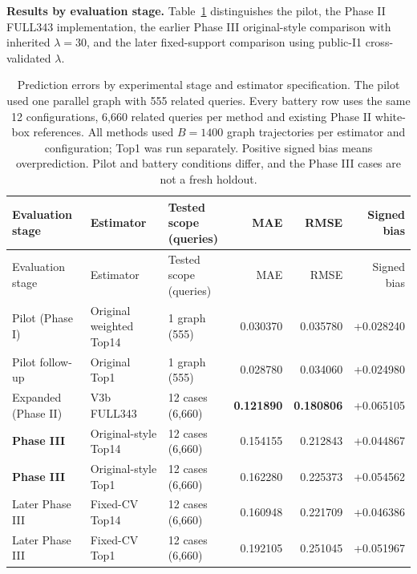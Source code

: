 \documentclass[10pt,a4paper]{article}
\begin{document}
\textbf{Results by evaluation stage.} Table~\ref{tab:retrospective-m3-overall} distinguishes the pilot, the Phase II FULL343 implementation, the earlier Phase III original-style comparison with inherited $\lambda=30$, and the later fixed-support comparison using public-I1 cross-validated $\lambda$.

\begingroup
\footnotesize
\setlength{\tabcolsep}{3pt}
\begin{longtable}{@{}p{}p{}p{}rrr@{}}
\caption{Prediction errors by experimental stage and estimator specification. The pilot used one parallel graph with 555 related queries. Every battery row uses the same 12 configurations, 6,660 related queries per method and existing Phase II white-box references. All methods used $B=1400$ graph trajectories per estimator and configuration; Top1 was run separately. Positive signed bias means overprediction. Pilot and battery conditions differ, and the Phase III cases are not a fresh holdout.}\label{tab:retrospective-m3-overall}\\
\toprule
Evaluation stage & Estimator & \shortstack{Tested scope\\(queries)} & MAE & RMSE & \shortstack{Signed\\bias} \\
\midrule\endfirsthead
\toprule
Evaluation stage & Estimator & \shortstack{Tested scope\\(queries)} & MAE & RMSE & \shortstack{Signed\\bias} \\
\midrule\endhead
Pilot (Phase I) & Original weighted Top14 & 1 graph (555) & 0.030370 & 0.035780 & +0.028240 \\
Pilot follow-up & Original Top1 & 1 graph (555) & 0.028780 & 0.034060 & +0.024980 \\
Expanded (Phase II) & V3b FULL343 & 12 cases (6,660) & \textbf{0.121890} & \textbf{0.180806} & +0.065105 \\
\textbf{Phase III} & Original-style Top14 & 12 cases (6,660) & 0.154155 & 0.212843 & +0.044867 \\
\textbf{Phase III} & Original-style Top1 & 12 cases (6,660) & 0.162280 & 0.225373 & +0.054562 \\
Later Phase III & Fixed-CV Top14 & 12 cases (6,660) & 0.160948 & 0.221709 & +0.046386 \\
Later Phase III & Fixed-CV Top1 & 12 cases (6,660) & 0.192105 & 0.251045 & +0.051967 \\
\bottomrule
\end{longtable}
\endgroup
\end{document}

